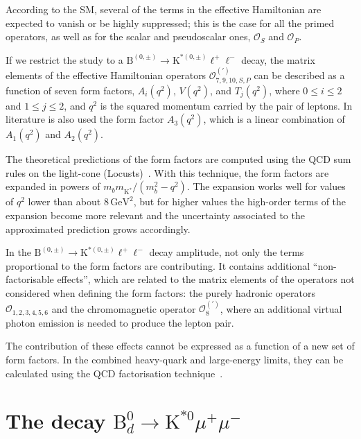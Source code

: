 According to the SM, several of the terms in the effective Hamiltonian are expected to vanish or be highly suppressed; this is the case for all the primed operators, as well as for the scalar and pseudoscalar ones, ${\mathcal{O}}_{S}$ and ${\mathcal{O}}_{P}$.

If we restrict the study to a $\mathrm{B}^{(0,\pm)}\to\mathrm{K}^{*(0,\pm)}\ell^+\ell^-$ decay, the matrix elements of the effective Hamiltonian operators ${\mathcal{O}}^{(\prime)}_{7,9,10,S,P}$ can be described as a function of seven form factors, $A_i(q^2)$, $V(q^2)$, and $T_j(q^2)$, where $0\le i\le2$ and $1\le j\le2$, and $q^2$ is the squared momentum carried by the pair of leptons.
In literature is also used the form factor $A_3(q^2)$, which is a linear combination of $A_1(q^2)$ and $A_2(q^2)$.

The theoretical predictions of the form factors are computed using the QCD sum rules on the light-cone (Locusts)~\cite{Khodjamirian:2001bj}.
With this technique, the form factors are expanded in powers of $m_b m_{\mathrm{K}^*}/(m_b^2-q^2)$.
The expansion works well for values of $q^2$ lower than about $8\,\mathrm{GeV}^2$, but for higher values the high-order terms of the expansion become more relevant and the uncertainty associated to the approximated prediction grows accordingly.

In the $\mathrm{B}^{(0,\pm)}\to\mathrm{K}^{*(0,\pm)}\ell^+\ell^-$ decay amplitude, not only the terms proportional to the form factors are contributing.
It contains additional ``non-factorisable effects'', which are related to the matrix elements of the operators not considered when defining the form factors: the purely hadronic operators ${\mathcal{O}}_{1,2,3,4,5,6}$ and the chromomagnetic operator ${\mathcal{O}}^{(\prime)}_{8}$, where an additional virtual photon emission is needed to produce the lepton pair.

The contribution of these effects cannot be expressed as a function of a new set of form factors.
In the combined heavy-quark and large-energy limits, they can be calculated using the QCD factorisation technique~\cite{Beneke:2000wa,Beneke:2001at,Beneke:2004dp}.


\section[The decay B0 to K*0 mu+ mu-]{The decay $\mathrm{B}^0_d \to \mathrm{K}^{*0} \mu^+ \mu^-$}
\label{sec:Kstmm}

